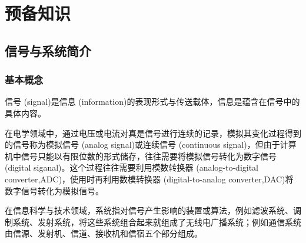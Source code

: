 \documentclass{ctexbook}
\begin{document}
\renewcommand{\contentsname}{简要目录}
\tableofcontents

\clearpage

\renewcommand{\contentsname}{详尽目录}
\setcounter{tocdepth}{2}
\tableofcontents%
\mainmatter%
\chapter{预备知识}%
\section{信号与系统简介}\label{sec:Introduction}

\subsection{基本概念}\label{sub:basic_concepts}
信号 (signal)是信息 (information)的表现形式与传送载体，信息是蕴含在信号中的具体内容。

在电学领域中，通过电压或电流对真是信号进行连续的记录，模拟其变化过程得到的信号称为模拟信号 (analog signal)或连续信号 (continuous signal)，但由于计算机中信号只能以有限位数的形式储存，往往需要将模拟信号转化为数字信号(digital siganal)。这个过程往往需要利用模数转换器 (analog-to-digital converter,ADC)，使用时再利用数模转换器 (digital-to-analog converter,DAC)将数字信号转化为模拟信号。

在信息科学与技术领域，系统指对信号产生影响的装置或算法，例如滤波系统、调制系统、发射系统，将这些系统组合起来就组成了无线电广播系统；例如通信系统由信源、发射机、信道、接收机和信宿五个部分组成。
\end{document}
